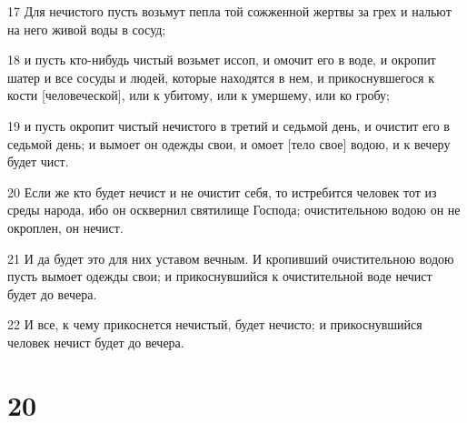 \par 17 Для нечистого пусть возьмут пепла той сожженной жертвы за грех и нальют на него живой воды в сосуд;
\par 18 и пусть кто-нибудь чистый возьмет иссоп, и омочит его в воде, и окропит шатер и все сосуды и людей, которые находятся в нем, и прикоснувшегося к кости [человеческой], или к убитому, или к умершему, или ко гробу;
\par 19 и пусть окропит чистый нечистого в третий и седьмой день, и очистит его в седьмой день; и вымоет он одежды свои, и омоет [тело свое] водою, и к вечеру будет чист.
\par 20 Если же кто будет нечист и не очистит себя, то истребится человек тот из среды народа, ибо он осквернил святилище Господа; очистительною водою он не окроплен, он нечист.
\par 21 И да будет это для них уставом вечным. И кропивший очистительною водою пусть вымоет одежды свои; и прикоснувшийся к очистительной воде нечист будет до вечера.
\par 22 И все, к чему прикоснется нечистый, будет нечисто; и прикоснувшийся человек нечист будет до вечера.

\chapter{20}


